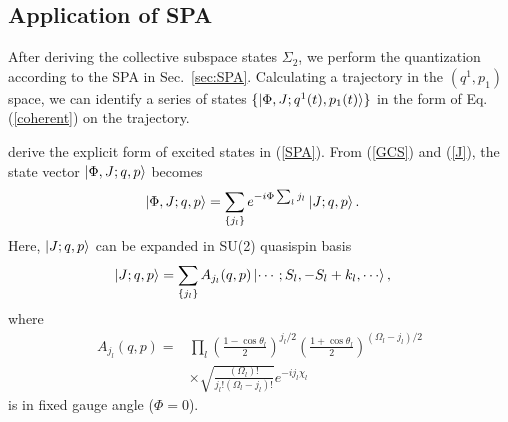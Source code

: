 \documentclass[%
superscriptaddress,
showpacs,
nofootinbib,
amsmath,amssymb,
aps,
prc,
twocolumn,
floatfix ]%
{revtex4-1}
\begin{document}


\subsection{Application of SPA}

After deriving the collective subspace states $\Sigma_2$, 
we perform the quantization according to the SPA in Sec.~\ref{sec:SPA}.
Calculating a trajectory in the $(q^1,p_1)$ space,
we can identify a series of states $\{\ket{\Phi,J;q^1(t),p_1(t)}\}$
in the form of Eq. (\ref{coherent}) on the trajectory.




derive the explicit form of excited states in (\ref{SPA}). From (\ref{GCS}) and (\ref{J}), the state vector $\ket{\Phi,J;q,p}$ becomes
\begin{align}
  \ket{\Phi,J;q,p} &= \sum_{\{j_l\}} e^{-i\Phi \sum_l j_l} \ket{J;q,p} .
\end{align}
Here, $\ket{J;q,p}$ can be expanded in SU(2) quasispin basis
\begin{align}
  \ket{J;q,p} &= \sum_{\{j_l\}} A_{j_l}(q,p) \ket{\cdots;S_l,-S_l+k_l,\cdots}, 
\end{align}
where 
\begin{align}
  A_{j_l}(q,p) =& \prod_l \left(\frac{1-\cos{\theta}_l}{2}\right)^{j_l/2}\left(\frac{1+\cos{\theta}_l}{2}\right)^{(\Omega_l-j_l)/2}
  \nonumber \\
  &\times\sqrt{\frac{(\Omega_l)!}{j_l!(\Omega_l-j_l)!}} e^{-ij_l\chi_l} 
\end{align}
is in fixed gauge angle ($\Phi=0$).
\end{document}
